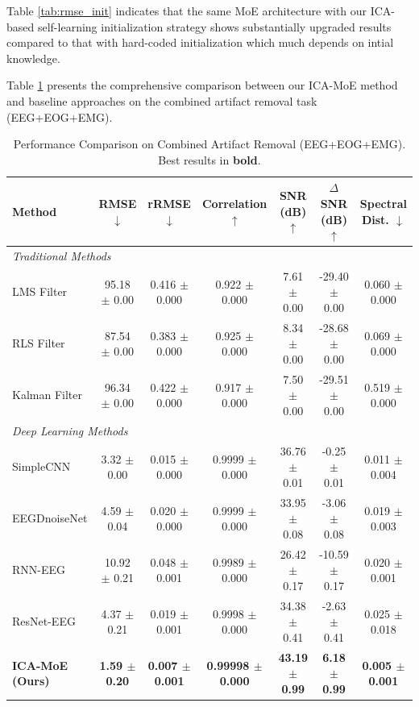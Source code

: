 \documentclass{article}
\begin{document}
Table \ref{tab:rmse_init} indicates that the same MoE architecture with our ICA-based self-learning initialization strategy shows substantially upgraded results compared to that with hard-coded initialization which much depends on intial knowledge.

Table \ref{tab:overall_results} presents the comprehensive comparison between our ICA-MoE method and baseline approaches on the combined artifact removal task (EEG+EOG+EMG).



\begin{table}[!t]
\centering
\caption{Performance Comparison on Combined Artifact Removal (EEG+EOG+EMG). Best results in \textbf{bold}.}
\label{tab:overall_results}
\begin{tabular}{lcccccc}
\toprule
\textbf{Method} & \textbf{RMSE} $\downarrow$ & \textbf{rRMSE} $\downarrow$ & \textbf{Correlation} $\uparrow$ & \textbf{SNR (dB)} $\uparrow$ & \textbf{$\Delta$SNR (dB)} $\uparrow$ & \textbf{Spectral Dist.} $\downarrow$ \\
\midrule
\multicolumn{7}{l}{\textit{Traditional Methods}} \\
LMS Filter & 95.18 $\pm$ 0.00 & 0.416 $\pm$ 0.000 & 0.922 $\pm$ 0.000 & 7.61 $\pm$ 0.00 & -29.40 $\pm$ 0.00 & 0.060 $\pm$ 0.000 \\
RLS Filter & 87.54 $\pm$ 0.00 & 0.383 $\pm$ 0.000 & 0.925 $\pm$ 0.000 & 8.34 $\pm$ 0.00 & -28.68 $\pm$ 0.00 & 0.069 $\pm$ 0.000 \\
Kalman Filter & 96.34 $\pm$ 0.00 & 0.422 $\pm$ 0.000 & 0.917 $\pm$ 0.000 & 7.50 $\pm$ 0.00 & -29.51 $\pm$ 0.00 & 0.519 $\pm$ 0.000 \\
\midrule
\multicolumn{7}{l}{\textit{Deep Learning Methods}} \\
SimpleCNN & 3.32 $\pm$ 0.00 & 0.015 $\pm$ 0.000 & 0.9999 $\pm$ 0.000 & 36.76 $\pm$ 0.01 & -0.25 $\pm$ 0.01 & 0.011 $\pm$ 0.004 \\
EEGDnoiseNet & 4.59 $\pm$ 0.04 & 0.020 $\pm$ 0.000 & 0.9999 $\pm$ 0.000 & 33.95 $\pm$ 0.08 & -3.06 $\pm$ 0.08 & 0.019 $\pm$ 0.003 \\
RNN-EEG & 10.92 $\pm$ 0.21 & 0.048 $\pm$ 0.001 & 0.9989 $\pm$ 0.000 & 26.42 $\pm$ 0.17 & -10.59 $\pm$ 0.17 & 0.020 $\pm$ 0.001 \\
ResNet-EEG & 4.37 $\pm$ 0.21 & 0.019 $\pm$ 0.001 & 0.9998 $\pm$ 0.000 & 34.38 $\pm$ 0.41 & -2.63 $\pm$ 0.41 & 0.025 $\pm$ 0.018 \\
\midrule
\textbf{ICA-MoE (Ours)} & \textbf{1.59 $\pm$ 0.20} & \textbf{0.007 $\pm$ 0.001} & \textbf{0.99998 $\pm$ 0.000} & \textbf{43.19 $\pm$ 0.99} & \textbf{6.18 $\pm$ 0.99} & \textbf{0.005 $\pm$ 0.001} \\
\bottomrule
\end{tabular}
\end{table}
\end{document}
